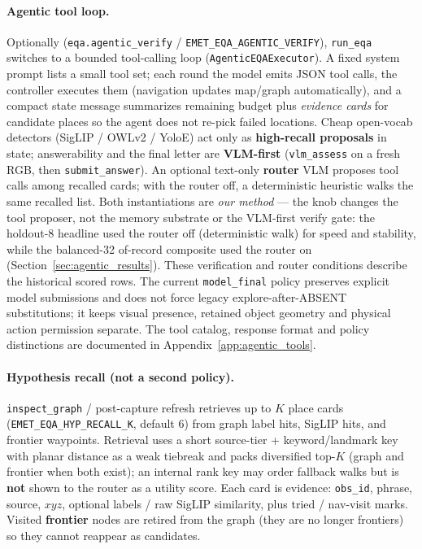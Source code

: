 \paragraph{Agentic tool loop.}
Optionally (\texttt{eqa.agentic\_verify} / \texttt{EMET\_EQA\_AGENTIC\_VERIFY}), \texttt{run\_eqa} switches to a bounded tool-calling loop (\texttt{AgenticEQAExecutor}).
A fixed system prompt lists a small tool set; each round the model emits JSON tool calls, the controller executes them (navigation updates map/graph automatically), and a compact state message summarizes remaining budget plus \emph{evidence cards} for candidate places so the agent does not re-pick failed locations.
Cheap open-vocab detectors (SigLIP / OWLv2 / YoloE) act only as \textbf{high-recall proposals} in state; answerability and the final letter are \textbf{VLM-first} (\texttt{vlm\_assess} on a fresh RGB, then \texttt{submit\_answer}).
An optional text-only \textbf{router} VLM proposes tool calls among recalled cards; with the router off, a deterministic heuristic walks the same recalled list. Both instantiations are \emph{our method} --- the knob changes the tool proposer, not the memory substrate or the VLM-first verify gate: the holdout-8 headline used the router off (deterministic walk) for speed and stability, while the balanced-32 of-record composite used the router on (Section~\ref{sec:agentic_results}).
These verification and router conditions describe the historical scored rows.
The current \texttt{model\_final} policy preserves explicit model submissions
and does not force legacy explore-after-ABSENT substitutions; it keeps visual
presence, retained object geometry and physical action permission separate.
The tool catalog, response format and policy distinctions are documented in
Appendix~\ref{app:agentic_tools}.

\paragraph{Hypothesis recall (not a second policy).}
\texttt{inspect\_graph} / post-capture refresh retrieves up to $K$ place cards (\texttt{EMET\_EQA\_HYP\_RECALL\_K}, default 6) from graph label hits, SigLIP hits, and frontier waypoints.
Retrieval uses a short source-tier + keyword/landmark key with planar distance as a weak tiebreak and packs diversified top-$K$ (graph and frontier when both exist); an internal rank key may order fallback walks but is \textbf{not} shown to the router as a utility score.
Each card is evidence: \texttt{obs\_id}, phrase, source, $xyz$, optional labels / raw SigLIP similarity, plus tried / nav-visit marks.
Visited \textbf{frontier} nodes are retired from the graph (they are no longer frontiers) so they cannot reappear as candidates.

